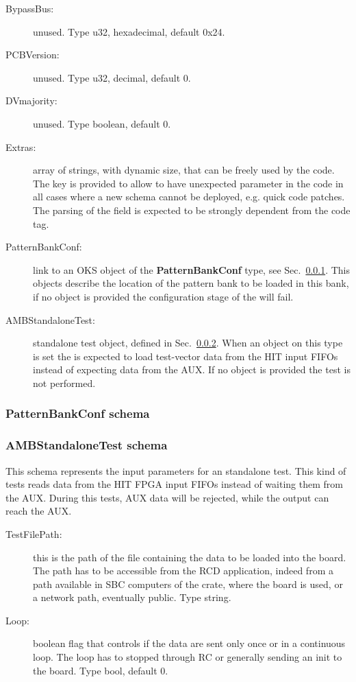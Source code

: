 \begin{description}
\item[BypassBus:] unused. Type u32, hexadecimal, default 0x24.

\item[PCBVersion:] unused. Type u32, decimal, default 0.

\item[DVmajority:] unused. Type boolean, default 0.

\item[Extras:] array of strings, with dynamic size, that can be freely used by the code.
The key is provided to allow to have unexpected parameter in the code in all cases
where a new schema cannot be deployed, e.g. quick code patches. The parsing of the
field is expected to be strongly dependent from the code tag.

\item[PatternBankConf:] link to an OKS object of the \textbf{PatternBankConf}
 type,
see Sec.~\ref{sec:pattbankschema}. This objects describe the location of the pattern
bank to be loaded in this bank, if no object is provided the configuration stage
of the \RCModule will fail.

\item[AMBStandaloneTest:] standalone test object, defined in Sec.~\ref{sec:ambtestschema}.
When an object on this type is set the \AMBoard is expected to load test-vector
data from the HIT input FIFOs instead of expecting data from the AUX. If no
object is provided the test is not performed.
\end{description}


\subsubsection{PatternBankConf schema}
\label{sec:pattbankschema}

\subsubsection{AMBStandaloneTest schema}
\label{sec:ambtestschema}

This schema represents the input parameters for an \AMBoard standalone test.
This kind of tests reads data from the HIT FPGA input FIFOs instead of waiting
them from the AUX. During this tests, AUX data will be rejected, while the
output can reach the AUX.

\begin{description}
	\item[TestFilePath:] this is the path of the file containing the data to
	be loaded into the board. The path has to be accessible from the RCD application,
 indeed	from a path available in SBC computers of the crate, where the board is used,
 or a network path, eventually public. Type string.
 
 \item[Loop:] boolean flag that controls if the data are sent only once or
 in a continuous loop. The loop has to stopped through RC or generally sending
 an init to the board. Type bool, default 0.
\end{description}